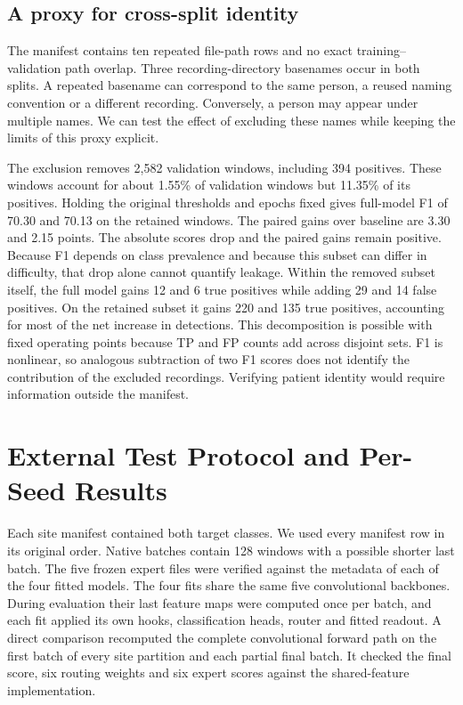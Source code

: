 \documentclass{article}
\begin{document}
\subsection{A proxy for cross-split identity}
The manifest contains ten repeated file-path rows and no exact training--validation path overlap. Three recording-directory basenames occur in both splits. A repeated basename can correspond to the same person, a reused naming convention or a different recording. Conversely, a person may appear under multiple names. We can test the effect of excluding these names while keeping the limits of this proxy explicit.

The exclusion removes 2,582 validation windows, including 394 positives. These windows account for about 1.55\% of validation windows but 11.35\% of its positives. Holding the original thresholds and epochs fixed gives full-model F1 of 70.30 and 70.13 on the retained windows. The paired gains over baseline are 3.30 and 2.15 points. The absolute scores drop and the paired gains remain positive. Because F1 depends on class prevalence and because this subset can differ in difficulty, that drop alone cannot quantify leakage. Within the removed subset itself, the full model gains 12 and 6 true positives while adding 29 and 14 false positives. On the retained subset it gains 220 and 135 true positives, accounting for most of the net increase in detections. This decomposition is possible with fixed operating points because TP and FP counts add across disjoint sets. F1 is nonlinear, so analogous subtraction of two F1 scores does not identify the contribution of the excluded recordings. Verifying patient identity would require information outside the manifest.

\section{External Test Protocol and Per-Seed Results}
Each site manifest contained both target classes. We used every manifest row in its original order. Native batches contain 128 windows with a possible shorter last batch. The five frozen expert files were verified against the metadata of each of the four fitted models. The four fits share the same five convolutional backbones. During evaluation their last feature maps were computed once per batch, and each fit applied its own hooks, classification heads, router and fitted readout. A direct comparison recomputed the complete convolutional forward path on the first batch of every site partition and each partial final batch. It checked the final score, six routing weights and six expert scores against the shared-feature implementation.

\clearpage
\end{document}
